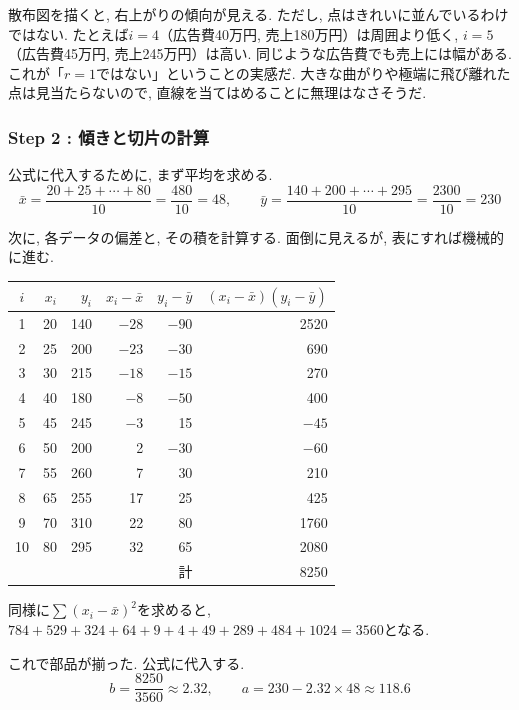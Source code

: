 
散布図を描くと, 右上がりの傾向が見える.
ただし, 点はきれいに並んでいるわけではない.
たとえば$i = 4$（広告費40万円, 売上180万円）は周囲より低く, $i = 5$（広告費45万円, 売上245万円）は高い.
同じような広告費でも売上には幅がある. これが「$r = 1$ではない」ということの実感だ.
大きな曲がりや極端に飛び離れた点は見当たらないので, 直線を当てはめることに無理はなさそうだ.

\subsubsection*{Step 2 : 傾きと切片の計算}

公式に代入するために, まず平均を求める.
\[
  \bar{x} = \frac{20 + 25 + \cdots + 80}{10} = \frac{480}{10} = 48, \qquad
  \bar{y} = \frac{140 + 200 + \cdots + 295}{10} = \frac{2300}{10} = 230
\]

次に, 各データの偏差と, その積を計算する.
面倒に見えるが, 表にすれば機械的に進む.

\begin{center}
\begin{tabular}{crrrrr}
\hline
$i$ & $x_i$ & $y_i$ & $x_i - \bar{x}$ & $y_i - \bar{y}$ & $(x_i - \bar{x})(y_i - \bar{y})$ \\
\hline
1 & 20 & 140 & $-28$ & $-90$ & 2520 \\
2 & 25 & 200 & $-23$ & $-30$ & 690 \\
3 & 30 & 215 & $-18$ & $-15$ & 270 \\
4 & 40 & 180 & $-8$ & $-50$ & 400 \\
5 & 45 & 245 & $-3$ & 15 & $-45$ \\
6 & 50 & 200 & 2 & $-30$ & $-60$ \\
7 & 55 & 260 & 7 & 30 & 210 \\
8 & 65 & 255 & 17 & 25 & 425 \\
9 & 70 & 310 & 22 & 80 & 1760 \\
10 & 80 & 295 & 32 & 65 & 2080 \\
\hline
 & & & & 計 & 8250 \\
\hline
\end{tabular}
\end{center}

同様に$\sum(x_i - \bar{x})^2$を求めると, $784 + 529 + 324 + 64 + 9 + 4 + 49 + 289 + 484 + 1024 = 3560$となる.

これで部品が揃った. 公式に代入する.
\[
  b = \frac{8250}{3560} \approx 2.32, \qquad a = 230 - 2.32 \times 48 \approx 118.6
\]

